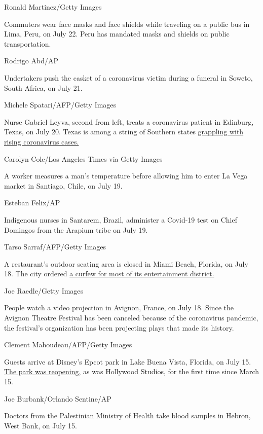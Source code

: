 Ronald Martinez/Getty Images

Commuters wear face masks and face shields while traveling on a public
bus in Lima, Peru, on July 22. Peru has mandated masks and shields on
public transportation.

Rodrigo Abd/AP

Undertakers push the casket of a coronavirus victim during a funeral in
Soweto, South Africa, on July 21.

Michele Spatari/AFP/Getty Images

Nurse Gabriel Leyva, second from left, treats a coronavirus patient in
Edinburg, Texas, on July 20. Texas is among a string of Southern states
\href{https://www.cnn.com/2020/07/22/politics/chip-roy-texas-coronavirus-cnntv/index.html}{grappling
with rising coronavirus cases.}

Carolyn Cole/Los Angeles Times via Getty Images

A worker measures a man's temperature before allowing him to enter La
Vega market in Santiago, Chile, on July 19.

Esteban Felix/AP

Indigenous nurses in Santarem, Brazil, administer a Covid-19 test on
Chief Domingos from the Arapium tribe on July 19.

Tarso Sarraf/AFP/Getty Images

A restaurant's outdoor seating area is closed in Miami Beach, Florida,
on July 18. The city ordered
\href{https://edition.cnn.com/world/live-news/coronavirus-pandemic-07-17-20-intl/h_9581f7656c9969cf26c2a626790f86be}{a
curfew for most of its entertainment district.}

Joe Raedle/Getty Images

People watch a video projection in Avignon, France, on July 18. Since
the Avignon Theatre Festival has been canceled because of the
coronavirus pandemic, the festival's organization has been projecting
plays that made its history.

Clement Mahoudeau/AFP/Getty Images

Guests arrive at Disney's Epcot park in Lake Buena Vista, Florida, on
July 15.
\href{https://www.cnn.com/travel/article/disney-world-epcot-reopens/index.html}{The
park was reopening,} as was Hollywood Studios, for the first time since
March 15.

Joe Burbank/Orlando Sentine/AP

Doctors from the Palestinian Ministry of Health take blood samples in
Hebron, West Bank, on July 15.

